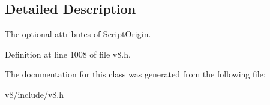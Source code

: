\subsection{Detailed Description}
The optional attributes of \mbox{\hyperlink{classv8_1_1ScriptOrigin}{Script\+Origin}}. 

Definition at line 1008 of file v8.\+h.



The documentation for this class was generated from the following file\+:\begin{DoxyCompactItemize}
\item 
v8/include/v8.\+h\end{DoxyCompactItemize}
